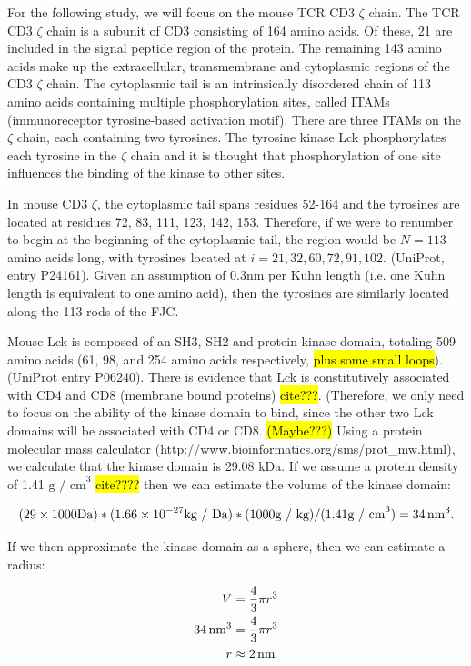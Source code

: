 \documentclass[../AdvancementSummary.tex]{subfiles}
\begin{document}
For the following study, we will focus on the mouse TCR CD3 $\zeta$ chain. The TCR CD3 $\zeta$ chain is a subunit of CD3 consisting of 164 amino acids.  Of these, 21 are included in the signal peptide region of the protein.  The remaining 143 amino acids make up the extracellular, transmembrane and cytoplasmic regions of the CD3 $\zeta$ chain.  The cytoplasmic tail is an intrinsically disordered chain of 113 amino acids containing multiple phosphorylation sites, called ITAMs (immunoreceptor tyrosine-based activation motif). There are three ITAMs on the $\zeta$ chain, each containing two tyrosines. The tyrosine kinase Lck phosphorylates each tyrosine in the $\zeta$ chain and it is thought that phosphorylation of one site influences the binding of the kinase to other sites.  

In mouse CD3 $\zeta$, the cytoplasmic tail spans residues 52-164 and the tyrosines are located at residues 72, 83, 111, 123, 142, 153.  Therefore, if we were to renumber to begin at the beginning of the cytoplasmic tail, the region would be $N=113$ amino acids long, with tyrosines located at $i= 21, 32, 60, 72, 91, 102$.  (UniProt, entry P24161). Given an assumption of 0.3nm per Kuhn length (i.e. one Kuhn length is equivalent to one amino acid), then the tyrosines are similarly located along the 113 rods of the FJC.

Mouse Lck is composed of an SH3, SH2 and protein kinase domain, totaling 509 amino acids (61, 98, and 254 amino acids respectively, \hl{plus some small loops}). (UniProt entry P06240). There is evidence that Lck is constitutively associated with CD4 and CD8 (membrane bound proteins) \hl{cite???}.  (Therefore, we only need to focus on the ability of the kinase domain to bind, since the other two Lck domains will be associated with CD4 or CD8. \hl{(Maybe???)} Using a protein molecular mass calculator (http://www.bioinformatics.org/sms/prot\_mw.html), we calculate that the kinase domain is 29.08 kDa.  If we assume a protein density of 1.41 $\mbox{g / cm}^3$ \hl{cite????} then we can estimate the volume of the kinase domain:

\begin{equation*}
(29 \times 1000 \mbox{Da}) * (1.66\times10^{-27} \mbox{kg / Da}) * (1000 \mbox{g / kg}) / (1.41 \mbox{g / cm}^3) = 34 \,\mbox{nm}^3.
\end{equation*}

If we then approximate the kinase domain as a sphere, then we can estimate a radius: 

\begin{align*}
V &= \frac{4}{3}\pi r^3 \\
34 \,\mbox{nm}^3 &= \frac{4}{3} \pi r^3 \\
r &\approx 2 \,\mbox{nm} \\
\end{align*}
\end{document}
